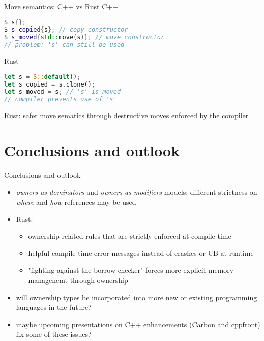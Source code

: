 \documentclass{beamer}
\begin{document}
\begin{frame}[fragile]{Move semantics: C++ vs Rust}
C++
\begin{lstlisting}[language=C++]
S s{};
S s_copied{s}; // copy constructor
S s_moved{std::move(s)}; // move constructor
// problem: 's' can still be used
\end{lstlisting}

Rust
\begin{lstlisting}[language=Rust]
let s = S::default();
let s_copied = s.clone();
let s_moved = s; // 's' is moved
// compiler prevents use of 's'
\end{lstlisting}

Rust: safer move sematics through destructive moves enforced by the compiler
\end{frame}


\section{Conclusions and outlook}

\begin{frame}{Conclusions and outlook}
\begin{itemize}
  \item \emph{owners-as-dominators} and \emph{owners-as-modifiers} models: different strictness on \emph{where} and \emph{how} references may be used
  \item Rust: 
  \begin{itemize}
    \item ownership-related rules that are strictly enforced at compile time
    \item helpful compile-time error messages instead of crashes or UB at runtime
    \item "fighting against the borrow checker" forces more explicit memory managenemt through ownership
  \end{itemize}
  \item will ownership types be incorporated into more new or existing programming languages in the future?
  \item maybe upcoming presentations on C++ enhancements (Carbon and cppfront) fix some of these issues?
\end{itemize}
\end{frame}
\end{document}
